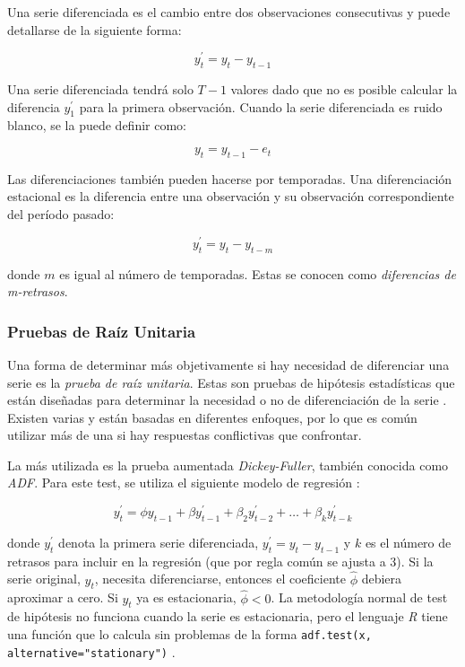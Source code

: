 \begin{spacing}{1.5}
Una serie diferenciada es el cambio entre dos observaciones consecutivas y puede detallarse de la siguiente forma:

\[ y_{t}^{\prime} = y_{t} - y_{t-1} \]

Una serie diferenciada tendrá solo $T-1$ valores dado que no es posible calcular la diferencia $y_{1}^{\prime}$ para la primera observación. Cuando la serie diferenciada es ruido blanco, se la puede definir como:

\[ y_{t} = y_{t-1} - e_{t} \]

Las diferenciaciones también pueden hacerse por temporadas. Una diferenciación estacional es la diferencia entre una observación y su observación correspondiente del período pasado:

\[ y_{t}^{\prime} = y_{t} - y_{t-m} \]

donde $m$ es igual al número de temporadas. Estas se conocen como \emph{diferencias de m-retrasos}.

\subsubsection{Pruebas de Raíz Unitaria}
Una forma de determinar más objetivamente si hay necesidad de diferenciar una serie es la \emph{prueba de raíz unitaria}. Estas son pruebas de hipótesis estadísticas que están diseñadas para determinar la necesidad o no de diferenciación de la serie \cite{hyndman}. Existen varias y están basadas en diferentes enfoques, por lo que es común utilizar más de una si hay respuestas conflictivas que confrontar. 

La más utilizada es la prueba aumentada \emph{Dickey-Fuller}, también conocida como \emph{ADF}. Para este test, se utiliza el siguiente modelo de regresión \cite{dickeyfuller}:

\[ y_{t}^{\prime} = \phi y_{t-1} + \beta y_{t-1}^{\prime} + \beta_{2} y_{t-2}^{\prime} + \ldots + \beta_{k} y_{t-k}^{\prime} \]

donde $y_{t}^{\prime}$ denota la primera serie diferenciada, $y_{t}^{\prime} = y_{t} - y_{t-1}$ y $k$ es el número de retrasos para incluir en la regresión (que por regla común se ajusta a 3). Si la serie original, $y_{t}$, necesita diferenciarse, entonces el coeficiente $\hat{\phi}$ debiera aproximar a cero. Si $y_{t}$ ya es estacionaria, $\hat{\phi} < 0$. La metodología normal de test de hipótesis no funciona cuando la serie es estacionaria, pero el lenguaje \emph{R} tiene una función que lo calcula sin problemas de la forma \texttt{adf.test(x, alternative="stationary")} \cite{packageForecast}.


\end{spacing}
